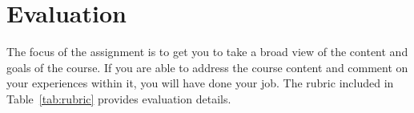 \documentclass[10pt,twocolumn]{amsart}	%
\begin{document}
\section{Evaluation} %
\label{sec:rubric}
The focus of the assignment is to get you to take a broad view of the content and goals of the course. If you are able to address the course content and comment on your experiences within it, you will have done your job. The rubric included in Table~\ref{tab:rubric} provides evaluation details.



\end{document}
